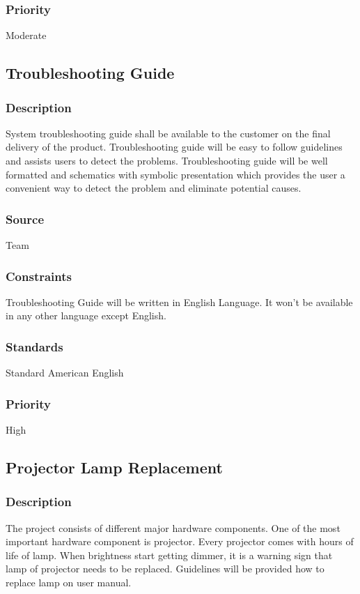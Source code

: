 \subsubsection{Priority}
Moderate

\subsection{Troubleshooting Guide}
\subsubsection{Description}
System troubleshooting guide shall be available to the customer on the final delivery of the product. Troubleshooting guide will be easy to follow guidelines and assists users to detect the problems. Troubleshooting guide will be well formatted and schematics with symbolic presentation which provides the user a convenient way to detect the problem and eliminate potential causes.
\subsubsection{Source}
Team 
\subsubsection{Constraints}
Troubleshooting Guide will be written in English Language. It won't be available in any other language except English. 
\subsubsection{Standards}
Standard American English
\subsubsection{Priority}
High

\subsection{Projector Lamp Replacement}
\subsubsection{Description}
The project consists of different major hardware components. One of the most important hardware component is projector. Every projector comes with hours of life of lamp. When brightness start getting dimmer, it is a warning sign that lamp of projector needs to be replaced. Guidelines will be provided how to replace lamp on user manual. 
